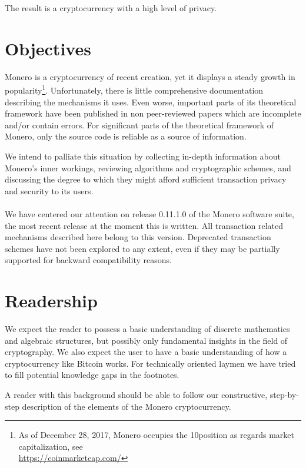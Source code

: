 The result is a cryptocurrency with a high level of privacy.




\section{Objectives}
\label{sec:goals}

Monero is a cryptocurrency of recent creation, yet it displays a steady growth in popularity\footnote{\label{marketcap_note}As of December 28\nth, 2017, Monero occupies the 10\nth position as regards market capitalization, see\\ \url{https://coinmarketcap.com/}}. 
Unfortunately, there is little comprehensive documentation describing the mechanisms it uses. Even worse, important parts of its theoretical framework have been published in non peer-reviewed papers which are incomplete and/or contain errors. For significant parts of the theoretical framework of Monero, only the source code is reliable as a source of information.
  
We intend to palliate this situation by collecting in-depth information about Monero’s inner workings, reviewing algorithms and cryptographic schemes, and discussing the degree to which they might afford sufficient transaction privacy and security to its users.
\\ 
\\ 

We have centered our attention on release 0.11.1.0 of the Monero software suite, the most recent release at the moment this is written. All transaction related mechanisms described here belong to this version. Deprecated transaction schemes have not been explored to any extent, even if they may be partially supported for backward compatibility reasons.


\section{Readership}

We expect the reader to possess a basic understanding of discrete mathematics and algebraic structures, but possibly only fundamental insights in the field of cryptography. We also expect the user to have a basic understanding of how a cryptocurrency like Bitcoin works. For technically oriented laymen we have tried to fill potential knowledge gaps in the footnotes.

A reader with this background should be able to follow our constructive, step-by-step description of the elements of the Monero cryptocurrency.


